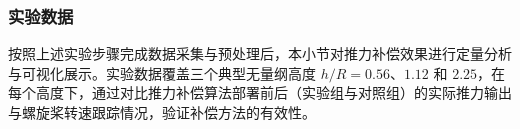 

\subsubsection{实验数据}

按照上述实验步骤完成数据采集与预处理后，本小节对推力补偿效果进行定量分析与可视化展示。实验数据覆盖三个典型无量纲高度 \(h/R = 0.56\)、\(1.12\) 和 \(2.25\)，在每个高度下，通过对比推力补偿算法部署前后（实验组与对照组）的实际推力输出与螺旋桨转速跟踪情况，验证补偿方法的有效性。




